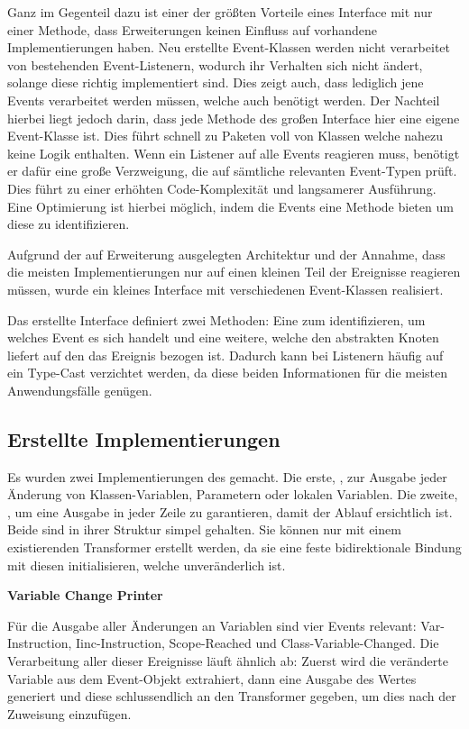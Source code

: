 Ganz im Gegenteil dazu ist einer der größten Vorteile eines Interface mit nur einer Methode, dass Erweiterungen keinen Einfluss auf vorhandene Implementierungen haben. Neu erstellte Event-Klassen werden nicht verarbeitet von bestehenden Event-Listenern, wodurch ihr Verhalten sich nicht ändert, solange diese richtig implementiert sind. Dies zeigt auch, dass lediglich jene Events verarbeitet werden müssen, welche auch benötigt werden. Der Nachteil hierbei liegt jedoch darin, dass jede Methode des großen Interface hier eine eigene Event-Klasse ist. Dies führt schnell zu Paketen voll von Klassen welche nahezu keine Logik enthalten. Wenn ein Listener auf alle Events reagieren muss, benötigt er dafür eine große Verzweigung, die auf sämtliche relevanten Event-Typen prüft. Dies führt zu einer erhöhten Code-Komplexität und langsamerer Ausführung. Eine Optimierung ist hierbei möglich, indem die Events eine Methode bieten um diese zu identifizieren.

Aufgrund der auf Erweiterung ausgelegten Architektur und der Annahme, dass die meisten Implementierungen nur auf einen kleinen Teil der Ereignisse reagieren müssen, wurde ein kleines Interface mit verschiedenen Event-Klassen realisiert.

Das erstellte Interface  definiert zwei Methoden: Eine zum identifizieren, um welches Event es sich handelt und eine weitere, welche den abstrakten Knoten liefert auf den das Ereignis bezogen ist. Dadurch kann bei Listenern häufig auf ein Type-Cast verzichtet werden, da diese beiden Informationen für die meisten Anwendungsfälle genügen.

\subsection{Erstellte Implementierungen} 

Es wurden zwei Implementierungen des  gemacht. Die erste, , zur Ausgabe jeder Änderung von Klassen-Variablen, Parametern oder lokalen Variablen. Die zweite, , um eine Ausgabe in jeder Zeile zu garantieren, damit der Ablauf ersichtlich ist. Beide sind in ihrer Struktur simpel gehalten. Sie können nur mit einem existierenden Transformer erstellt werden, da sie eine feste bidirektionale Bindung mit diesen initialisieren, welche unveränderlich ist.

\textbf{Variable Change Printer}

Für die Ausgabe aller Änderungen an Variablen sind vier Events relevant: Var-Instruction, Iinc-Instruction, Scope-Reached und Class-Variable-Changed. Die Verarbeitung aller dieser Ereignisse läuft ähnlich ab: Zuerst wird die veränderte Variable aus dem Event-Objekt extrahiert, dann eine Ausgabe des Wertes generiert und diese schlussendlich an den Transformer gegeben, um dies nach der Zuweisung einzufügen.

